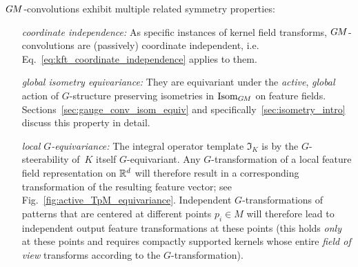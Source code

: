 $G\mkern-1.4muM$-convolutions exhibit multiple related symmetry properties:
\begin{itemize}[leftmargin=13em]
    \item[\it coordinate independence:]
        As specific instances of kernel field transforms, $G\mkern-1.4muM$-convolutions are (passively) coordinate independent, i.e. Eq.~\eqref{eq:kft_coordinate_independence} applies to them.
    \item[\it global isometry equivariance:]
        They are equivariant under the \emph{active}, \emph{global} action of $G$-structure preserving isometries in $\operatorname{Isom}_{G\mkern-1.4muM}$ on feature fields.
        Sections~\ref{sec:gauge_conv_isom_equiv} and specifically~\ref{sec:isometry_intro} discuss this property in detail.
    \item[\it local $G$-equivariance:]
        The integral operator template $\mathfrak{I}_K$ is by the $G$-steerability of~$K$ itself $G$-equivariant.
        Any $G$-transformation of a local feature field representation on $\mathbb{R}^d$ will therefore result in a corresponding transformation of the resulting feature vector; see Fig.~\ref{fig:active_TpM_equivariance}.
        Independent $G$-transformations of patterns that are centered at different points $p_i\in M$ will therefore lead to independent output feature transformations at these points (this holds \emph{only} at these points and requires compactly supported kernels whose entire \emph{field of view} transforms according to the $G$-transformation).
\end{itemize}


